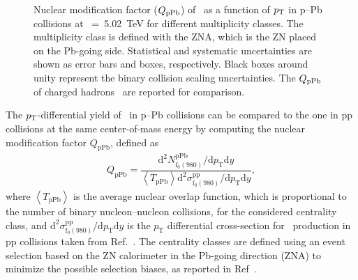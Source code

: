 \begin{figure}[!hbt]
	\centering
	\caption{ Nuclear modification factor ($Q_{\rm{pPb}}$) of \fzero~as a function of $p_{\rm{T}}$ in p--Pb collisions at \snn~=~5.02~TeV for different multiplicity classes. The multiplicity class is defined with the ZNA, which is the ZN placed on the Pb-going side. Statistical and systematic uncertainties are shown as error bars and boxes, respectively. Black boxes around unity represent the binary collision scaling uncertainties. The $Q_{\rm{pPb}}$ of charged hadrons~\cite{ALICE:2014xsp} are reported for comparison. }
	\label{fig:QpPb}
\end{figure}

The $p_{\rm{T}}$-differential yield of \fzero~in p--Pb collisions can be compared to the one in pp collisions at the same center-of-mass energy by computing the nuclear modification factor $Q_{\mbox{pPb}}$, defined as 
\begin{eqnarray}
Q_{\mbox{pPb}} = \dfrac{\mathrm{d}^{2} N_{\mathrm{f}_{0}(980)}^{\mathrm{pPb}} / \mathrm{d} p_{\mathrm{T}} \mathrm{d}y }{ \left\langle T_{\mathrm{pPb}} \right\rangle \mathrm{d}^{2} \sigma_{\mathrm{f}_{0}(980)}^{\mathrm{pp}}/ \mathrm{d} p_{\mathrm{T}} \mathrm{d}y },
\end{eqnarray}
where $\left\langle T_{\mathrm{pPb}} \right\rangle$ is the average nuclear overlap function, which is proportional to the number of binary nucleon--nucleon collisions, for the considered centrality class, and $\mathrm{d}^{2} \sigma_{\mathrm{f}_{0}(980)}^{\mathrm{pp}}/ \mathrm{d} p_{\mathrm{T}} \mathrm{d}y$ is the $p_{\mathrm{T}}$ differential cross-section for \fzero~production in pp collisions taken from Ref.~\cite{ALICE:2022qnb}. The centrality classes are defined using an event selection based on the ZN calorimeter in the Pb-going direction (ZNA) to minimize the possible selection biases, as reported in Ref~\cite{ALICE:2014xsp}.

